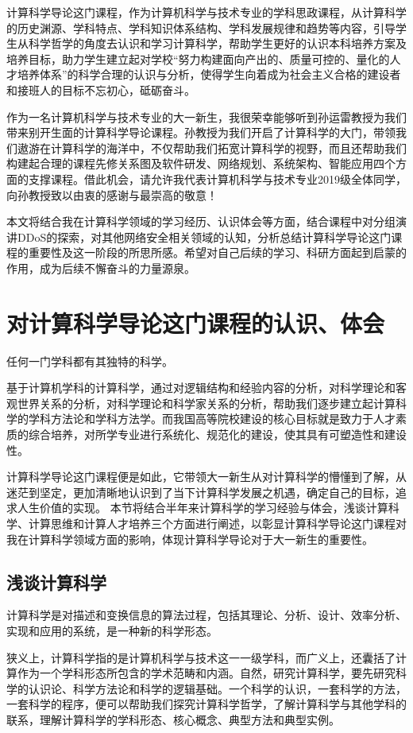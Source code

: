 \documentclass{article}
\begin{document}
计算科学导论这门课程，作为计算机科学与技术专业的学科思政课程，从计算科学的历史渊源、学科特点、学科知识体系结构、学科发展规律和趋势等内容，引导学生从科学哲学的角度去认识和学习计算科学，帮助学生更好的认识本科培养方案及培养目标，助力学生建立起对学校“努力构建面向产出的、质量可控的、量化的人才培养体系”的科学合理的认识与分析，使得学生向着成为社会主义合格的建设者和接班人的目标不忘初心，砥砺奋斗。

作为一名计算机科学与技术专业的大一新生，我很荣幸能够听到孙运雷教授为我们带来别开生面的计算科学导论课程。孙教授为我们开启了计算科学的大门，带领我们遨游在计算科学的海洋中，不仅帮助我们拓宽计算科学的视野，而且还帮助我们构建起合理的课程先修关系图及软件研发、网络规划、系统架构、智能应用四个方面的支撑课程。借此机会，请允许我代表计算机科学与技术专业2019级全体同学，向孙教授致以由衷的感谢与最崇高的敬意！

本文将结合我在计算科学领域的学习经历、认识体会等方面，结合课程中对分组演讲DDoS的探索，对其他网络安全相关领域的认知，分析总结计算科学导论这门课程的重要性及这一阶段的所思所感。希望对自己后续的学习、科研方面起到启蒙的作用，成为后续不懈奋斗的力量源泉。

\section{对计算科学导论这门课程的认识、体会}
任何一门学科都有其独特的科学。

基于计算机学科的计算科学，通过对逻辑结构和经验内容的分析，对科学理论和客观世界关系的分析，对科学理论和科学家关系的分析，帮助我们逐步建立起计算科学的学科方法论和学科方法学。而我国高等院校建设的核心目标就是致力于人才素质的综合培养，对所学专业进行系统化、规范化的建设，使其具有可塑造性和建设性。

计算科学导论这门课程便是如此，它带领大一新生从对计算科学的懵懂到了解，从迷茫到坚定，更加清晰地认识到了当下计算科学发展之机遇，确定自己的目标，追求人生价值的实现。
本节将结合半年来计算科学的学习经验与体会，浅谈计算科学、计算思维和计算人才培养三个方面进行阐述，以彰显计算科学导论这门课程对我在计算科学领域方面的影响，体现计算科学导论对于大一新生的重要性。

\subsection{浅谈计算科学}

计算科学是对描述和变换信息的算法过程，包括其理论、分析、设计、效率分析、实现和应用的系统，是一种新的科学形态。

狭义上，计算科学指的是计算机科学与技术这一一级学科，而广义上，还囊括了计算作为一个学科形态所包含的学术范畴和内涵。自然，研究计算科学，要先研究科学的认识论、科学方法论和科学的逻辑基础。一个科学的认识，一套科学的方法，一套科学的程序，便可以帮助我们探究计算科学哲学，了解计算科学与其他学科的联系，理解计算科学的学科形态、核心概念、典型方法和典型实例。
\end{document}
